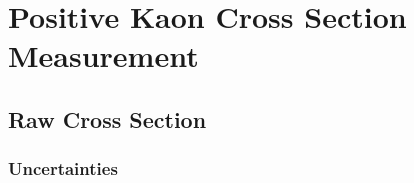 \chapter{Positive Kaon Cross Section Measurement}\label{ch:KaonXS}
\section{Raw Cross Section}\label{ch:KaonXSRaw}
\subsection{Uncertainties }\label{ch:KaonXSRawUnc}
